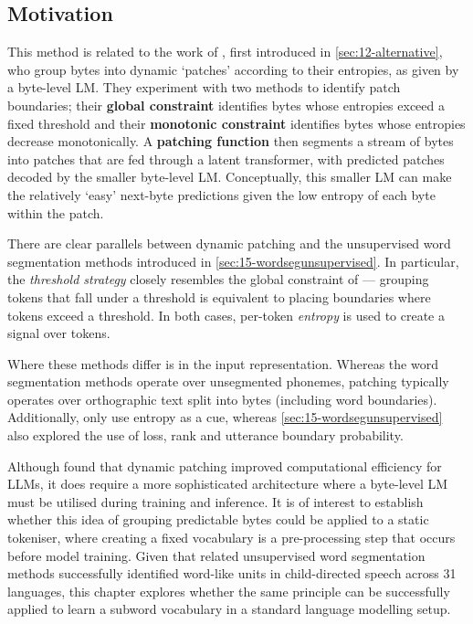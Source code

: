 \subsection{Motivation}\label{sec:16-motivation}

This method is related to the work of \citet{pagnoni2024byte}, first introduced in \cref{sec:12-alternative}, who group bytes into dynamic `patches' according to their entropies, as given by a byte-level LM. They experiment with two methods to identify patch boundaries; their \textbf{global constraint} identifies bytes whose entropies exceed a fixed threshold and their \textbf{monotonic constraint} identifies bytes whose entropies decrease monotonically. A \textbf{patching function} then segments a stream of bytes into patches that are fed through a latent transformer, with predicted patches decoded by the smaller byte-level LM. Conceptually, this smaller LM can make the relatively `easy' next-byte predictions given the low entropy of each byte within the patch. 


There are clear parallels between dynamic patching and the unsupervised word segmentation methods introduced in \cref{sec:15-wordsegunsupervised}. In particular, the \emph{threshold strategy} closely resembles the global constraint of \citet{pagnoni2024byte} --- grouping tokens that fall under a threshold is equivalent to placing boundaries where tokens exceed a threshold. In both cases, per-token \emph{entropy} is used to create a signal over tokens.

Where these methods differ is in the input representation. Whereas the word segmentation methods operate over unsegmented phonemes, patching typically operates over orthographic text split into bytes (including word boundaries). Additionally, \citet{pagnoni2024byte} only use entropy as a cue, whereas \cref{sec:15-wordsegunsupervised} also explored the use of loss, rank and utterance boundary probability.

Although \citet{pagnoni2024byte} found that dynamic patching improved computational efficiency for LLMs, it does require a more sophisticated architecture where a byte-level LM must be utilised during training and inference. It is of interest to establish whether this idea of grouping predictable bytes could be applied to a static tokeniser, where creating a fixed vocabulary is a pre-processing step that occurs before model training. Given that related unsupervised word segmentation methods successfully identified word-like units in child-directed speech across 31 languages, this chapter explores whether the same principle can be successfully applied to learn a subword vocabulary in a standard language modelling setup. 

